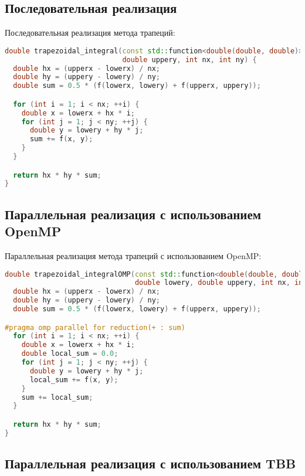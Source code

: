 \documentclass[]{article}
\theoremstyle{remark}
\theoremstyle{definition}
\begin{document}
\subsection{Последовательная реализация}

\par Последовательная реализация метода трапеций:

\begin{lstlisting}[language=C++]
double trapezoidal_integral(const std::function<double(double, double)>& f, double lowerx, double upperx, double lowery,
                            double uppery, int nx, int ny) {
  double hx = (upperx - lowerx) / nx;
  double hy = (uppery - lowery) / ny;
  double sum = 0.5 * (f(lowerx, lowery) + f(upperx, uppery));

  for (int i = 1; i < nx; ++i) {
    double x = lowerx + hx * i;
    for (int j = 1; j < ny; ++j) {
      double y = lowery + hy * j;
      sum += f(x, y);
    }
  }

  return hx * hy * sum;
}
\end{lstlisting}

\subsection{Параллельная реализация с использованием OpenMP}

\par Параллельная реализация метода трапеций с использованием OpenMP:

\begin{lstlisting}[language=C++]
double trapezoidal_integralOMP(const std::function<double(double, double)>& f, double lowerx, double upperx,
                               double lowery, double uppery, int nx, int ny) {
  double hx = (upperx - lowerx) / nx;
  double hy = (uppery - lowery) / ny;
  double sum = 0.5 * (f(lowerx, lowery) + f(upperx, uppery));

#pragma omp parallel for reduction(+ : sum)
  for (int i = 1; i < nx; ++i) {
    double x = lowerx + hx * i;
    double local_sum = 0.0;
    for (int j = 1; j < ny; ++j) {
      double y = lowery + hy * j;
      local_sum += f(x, y);
    }
    sum += local_sum;
  }

  return hx * hy * sum;
}

\end{lstlisting}

\subsection{Параллельная реализация с использованием TBB}
\end{document}
